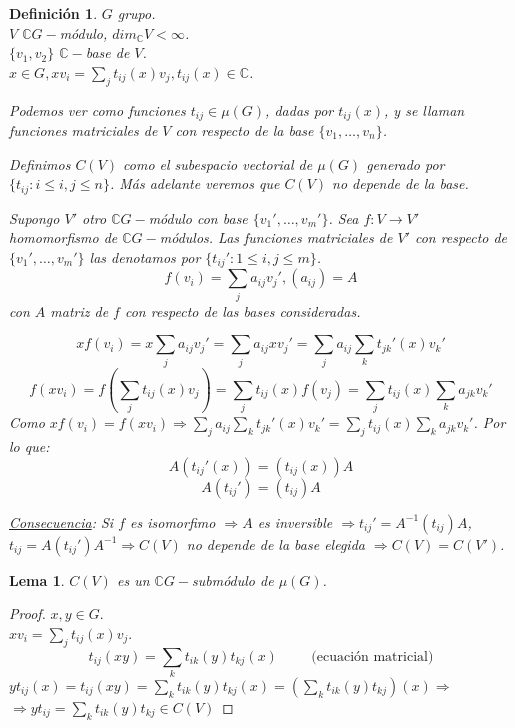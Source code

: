 \documentclass[11pt,a4paper]{article}
\theoremstyle{break}
\newtheorem{lemma}[theorem]{Lema}
\newtheorem{definition}[theorem]{Definición}
\begin{document}
\begin{definition}
$G$ grupo. \\
$V$ $\mathbb{C}G-$módulo, $dim_{\mathbb{C}} V < \infty$. \\
$\{v_{1}, v_{2}\}$ $\mathbb{C}-$base de $V$. \\
$x \in G, xv_{i} = \sum_{j} t_{ij}(x) v_{j}, t_{ij}(x) \in \mathbb{C}$.

Podemos ver como funciones $t_{ij} \in \mu(G)$, dadas por $t_{ij}(x)$, y se llaman funciones matriciales de $V$ con respecto de la base $\{v_{1}, \dots, v_{n}\}$.

Definimos $C(V)$ como el subespacio vectorial de $\mu(G)$ generado por $\{t_{ij}: i \leq i, j \leq n\}$. Más adelante veremos que $C(V)$ no depende de la base.

Supongo $V'$ otro $\mathbb{C}G-$módulo con base $\{v_{1}', \dots, v_{m}'\}$. Sea $f: V \to V'$ homomorfismo de $\mathbb{C}G-$módulos. Las funciones matriciales de $V'$ con respecto de $\{v_{1}', \dots, v_{m}'\}$ las denotamos por $\{t_{ij}': 1 \leq i, j \leq m\}$.
$$f(v_{i}) = \sum_{j} a_{ij}v_{j}', (a_{ij}) = A$$
con $A$ matriz de $f$ con respecto de las bases consideradas.

$$xf(v_{i}) = x \sum_{j} a_{ij} v_{j}' = \sum_{j} a_{ij} xv_{j}' = \sum_{j} a_{ij} \sum_{k} t_{jk}'(x)v_{k}'$$
$$f(xv_{i}) = f(\sum_{j} t_{ij}(x) v_{j}) = \sum_{j} t_{ij}(x) f(v_{j}) = \sum_{j} t_{ij}(x) \sum_{k}a_{jk}v_{k}'$$
Como $xf(v_{i}) = f(xv_{i}) \Rightarrow \sum_{j} a_{ij} \sum_{k} t_{jk}'(x)v_{k}' = \sum_{j} t_{ij}(x) \sum_{k}a_{jk}v_{k}'$. Por lo que:
$$A(t_{ij}'(x)) = (t_{ij}(x))A$$
$$A(t_{ij}') = (t_{ij})A$$

\underline{Consecuencia}: Si $f$ es isomorfimo $\Rightarrow A$ es inversible $\Rightarrow t_{ij}' = A^{-1}(t_{ij})A$, $t_{ij} = A(t_{ij}')A^{-1} \Rightarrow C(V)$ no depende de la base elegida $\Rightarrow C(V) = C(V')$.
\end{definition}

\begin{lemma}
$C(V)$ es un $\mathbb{C}G-$submódulo de $\mu(G)$.
\end{lemma}

\begin{proof}
$x, y \in G$. \\
$xv_{i} = \sum_{j} t_{ij}(x)v_{j}$.
$$t_{ij}(xy) = \sum_{k} t_{ik}(y) t_{kj}(x) \hspace{1cm} \text{(ecuación matricial)}$$
$y t_{ij}(x) = t_{ij}(xy) = \sum_{k} t_{ik}(y) t_{kj}(x)  = (\sum_{k} t_{ik}(y)t_{kj})(x) \Rightarrow$ \\ $\Rightarrow y t_{ij} = \sum_{k} t_{ik}(y) t_{kj} \in C(V)$
\end{proof}
\end{document}
